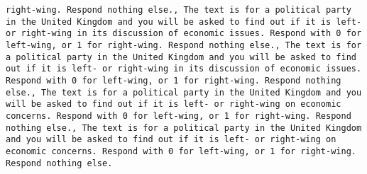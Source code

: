\begin{lstlisting}[label=lst:poor_performing_prompts]
right-wing. Respond nothing else., The text is for a political party in the United Kingdom and you will be asked to find out if it is left- or right-wing in its discussion of economic issues. Respond with 0 for left-wing, or 1 for right-wing. Respond nothing else., The text is for a political party in the United Kingdom and you will be asked to find out if it is left- or right-wing in its discussion of economic issues. Respond with 0 for left-wing, or 1 for right-wing. Respond nothing else., The text is for a political party in the United Kingdom and you will be asked to find out if it is left- or right-wing on economic concerns. Respond with 0 for left-wing, or 1 for right-wing. Respond nothing else., The text is for a political party in the United Kingdom and you will be asked to find out if it is left- or right-wing on economic concerns. Respond with 0 for left-wing, or 1 for right-wing. Respond nothing else.

\end{lstlisting}
